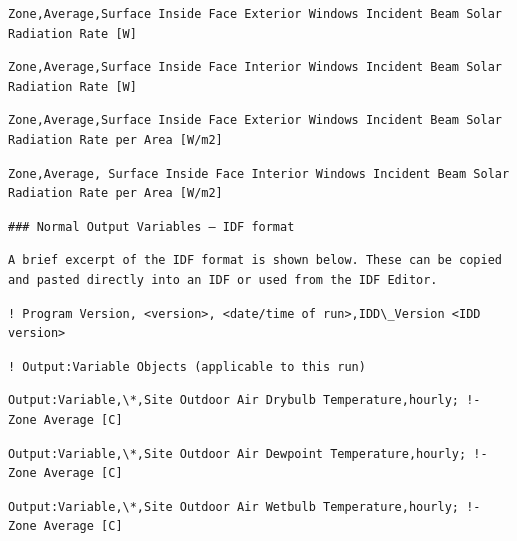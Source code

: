 \begin{lstlisting}
Zone,Average,Surface Inside Face Exterior Windows Incident Beam Solar Radiation Rate [W]
\end{lstlisting}

\begin{lstlisting}
Zone,Average,Surface Inside Face Interior Windows Incident Beam Solar Radiation Rate [W]
\end{lstlisting}

\begin{lstlisting}
Zone,Average,Surface Inside Face Exterior Windows Incident Beam Solar Radiation Rate per Area [W/m2]
\end{lstlisting}

\begin{lstlisting}
Zone,Average, Surface Inside Face Interior Windows Incident Beam Solar Radiation Rate per Area [W/m2]
\end{lstlisting}

\begin{lstlisting}
### Normal Output Variables – IDF format
\end{lstlisting}

\begin{lstlisting}
A brief excerpt of the IDF format is shown below. These can be copied and pasted directly into an IDF or used from the IDF Editor.
\end{lstlisting}

\begin{lstlisting}
! Program Version, <version>, <date/time of run>,IDD\_Version <IDD version>
\end{lstlisting}

\begin{lstlisting}
! Output:Variable Objects (applicable to this run)
\end{lstlisting}

\begin{lstlisting}
Output:Variable,\*,Site Outdoor Air Drybulb Temperature,hourly; !- Zone Average [C]
\end{lstlisting}

\begin{lstlisting}
Output:Variable,\*,Site Outdoor Air Dewpoint Temperature,hourly; !- Zone Average [C]
\end{lstlisting}

\begin{lstlisting}
Output:Variable,\*,Site Outdoor Air Wetbulb Temperature,hourly; !- Zone Average [C]
\end{lstlisting}

